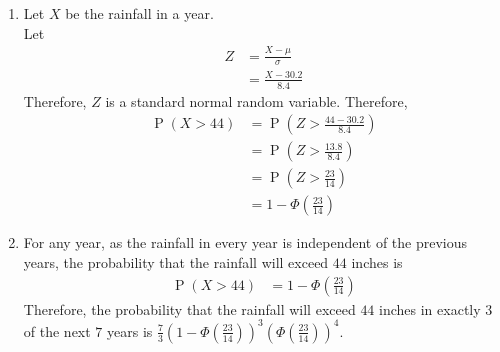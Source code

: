 \documentclass[fleqn, a4paper, 11pt, oneside]{amsart}
\theoremstyle{definition}
\theoremstyle{theorem}
\DeclareMathOperator{\prob}{\mathrm{P}}
\begin{document}
\begin{solution}
	\begin{enumerate}[leftmargin=*]
		\item
			Let $X$ be the rainfall in a year.\\
			Let
			\begin{align*}
				Z &= \frac{X - \mu}{\sigma}\\
				&= \frac{X - 30.2}{8.4}
			\end{align*}
			Therefore, $Z$ is a standard normal random variable.
			Therefore,
			\begin{align*}
				\prob(X > 44) &= \prob\left( Z > \frac{44 - 30.2}{8.4} \right)\\
				&= \prob\left( Z > \frac{13.8}{8.4} \right)\\
				&= \prob\left( Z > \frac{23}{14} \right)\\
				&= 1 - \Phi\left( \frac{23}{14} \right)
			\end{align*}
		\item
			For any year, as the rainfall in every year is independent of the previous years, the probability that the rainfall will exceed $44$ inches is
			\begin{align*}
				\prob(X > 44) &= 1 - \Phi\left( \frac{23}{14} \right)
			\end{align*}
			Therefore, the probability that the rainfall will exceed $44$ inches in exactly $3$ of the next $7$ years is $\frac{7}{3} \left( 1 - \Phi\left( \frac{23}{14} \right) \right)^3 \left( \Phi\left( \frac{23}{14} \right) \right)^4$.
	\end{enumerate}
\end{solution}
\end{document}
